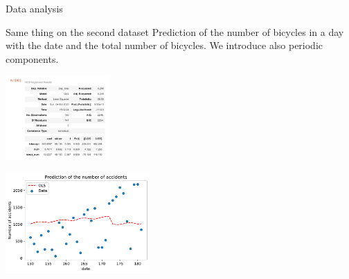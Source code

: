 \documentclass[unknownkeysallowed]{beamer}
\begin{document}
\begin{frame}{Data analysis}

\begin{block}{Same thing on the second dataset}
Prediction of the number of bicycles in a day with the date and the total number of bicycles. We introduce also periodic components.
\end{block}


\begin{minipage}[c]{.36\linewidth}
     \begin{center}
             \includegraphics[width=4cm]{stat_model_albert.pdf}
         \end{center}
   \end{minipage} \hfill
   \begin{minipage}[c]{.55\linewidth}
    \begin{center}
            \includegraphics[width=5.5cm]{accidentpredictionalbert1.pdf}
            
        \end{center}
        
 \end{minipage}



    
\end{frame}











\end{document}
